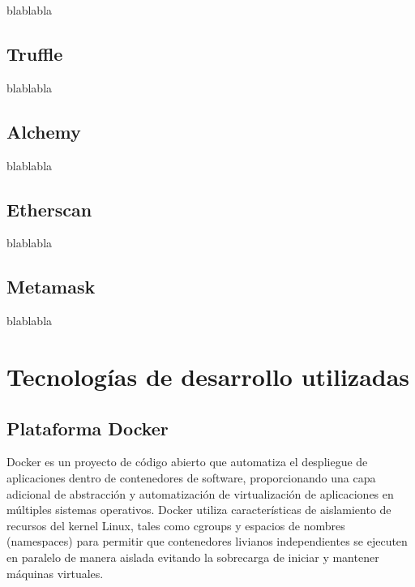 blablabla


\subsection{Truffle}

blablabla

\subsection{Alchemy}

blablabla


\subsection{Etherscan}

blablabla

\subsection{Metamask}

blablabla


\section{Tecnologías de desarrollo utilizadas}




\subsection{Plataforma Docker}

Docker \cite{docker_website} es un proyecto de código abierto que automatiza el despliegue de aplicaciones dentro de contenedores de software, proporcionando una capa adicional de abstracción y automatización de virtualización de aplicaciones en múltiples sistemas operativos. Docker utiliza características de aislamiento de recursos del kernel Linux, tales como cgroups y espacios de nombres (namespaces) para permitir que contenedores livianos independientes se ejecuten en paralelo de manera aislada evitando la sobrecarga de iniciar y mantener máquinas virtuales.




